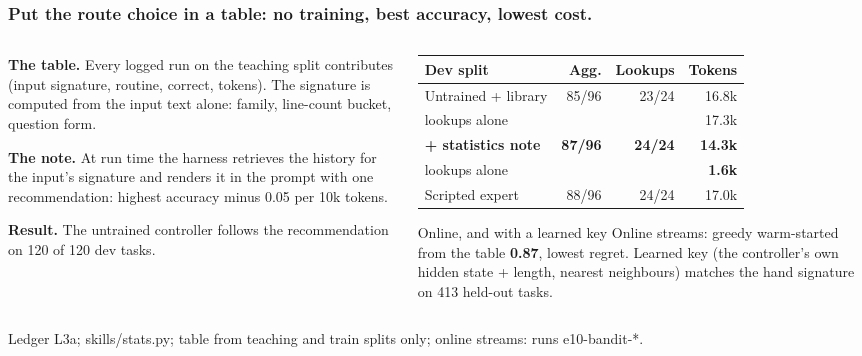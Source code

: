 \documentclass[aspectratio=169,11pt]{beamer}
\newcommand{\source}[1]{\vfill{\scriptsize\color{Gray}#1\par}}
\begin{document}
\begin{frame}[t]
\frametitle{Put the route choice in a table: no training, best accuracy, lowest cost.}
\begin{columns}[T,onlytextwidth]
\begin{column}{.5\textwidth}
\textbf{The table.} Every logged run on the teaching split contributes (input signature, routine,
correct, tokens). The signature is computed from the input text alone: family, line-count
bucket, question form.
\medskip

\textbf{The note.} At run time the harness retrieves the history for the input's signature and
renders it in the prompt with one recommendation: highest accuracy minus 0.05 per 10k tokens.
\medskip

\textbf{Result.} The untrained controller follows the recommendation on 120 of 120 dev tasks.
\end{column}
\begin{column}{.46\textwidth}
\scriptsize
\begin{tabular}{@{}lrrr@{}}
\toprule
Dev split & Agg. & Lookups & Tokens \\
\midrule
Untrained + library & 85/96 & 23/24 & 16.8k \\
\quad lookups alone & & & 17.3k \\
\textbf{+ statistics note} & \textbf{87/96} & \textbf{24/24} & \textbf{14.3k} \\
\quad lookups alone & & & \textbf{1.6k} \\
Scripted expert & 88/96 & 24/24 & 17.0k \\
\bottomrule
\end{tabular}
\medskip

\begin{block}{Online, and with a learned key}
Online streams: greedy warm-started from the table \textbf{0.87}, lowest regret. Learned key (the controller's own hidden state + length, nearest neighbours) matches the hand signature on 413 held-out tasks.
\end{block}
\end{column}
\end{columns}
\source{Ledger L3a; skills/stats.py; table from teaching and train splits only; online streams: runs e10-bandit-*.}
\end{frame}
\end{document}
